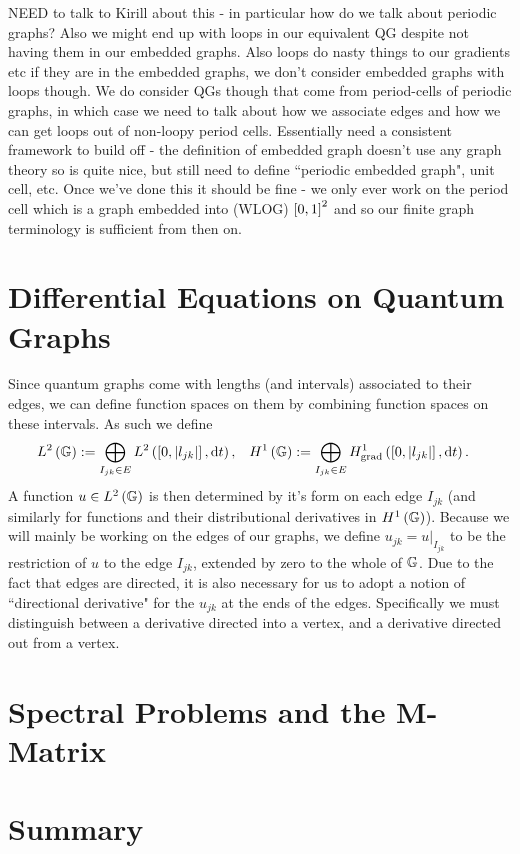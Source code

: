 NEED to talk to Kirill about this - in particular how do we talk about periodic graphs? Also we might end up with loops in our equivalent QG despite not having them in our embedded graphs.
Also loops do nasty things to our gradients etc if they are in the embedded graphs, we don't consider embedded graphs with loops though.
We do consider QGs though that come from period-cells of periodic graphs, in which case we need to talk about how we associate edges and how we can get loops out of non-loopy period cells.
Essentially need a consistent framework to build off - the definition of embedded graph doesn't use any graph theory so is quite nice, but still need to define ``periodic embedded graph", unit cell, etc.
Once we've done this it should be fine - we only ever work on the period cell which is a graph embedded into (WLOG) $\left[ 0,1 \right]^2$ and so our finite graph terminology is sufficient from then on.

\section{Differential Equations on Quantum Graphs}
Since quantum graphs come with lengths (and intervals) associated to their edges, we can define function spaces on them by combining function spaces on these intervals.
As such we define
\begin{align*}
	L^2\left( \mathbb{G} \right) := \bigoplus_{I_{jk}\in E} L^{2}\left( \left[ 0,\left\lvert l_{jk} \right\rvert \right],\mathrm{d}t \right),
	&\quad H^1\left( \mathbb{G} \right) := \bigoplus_{I_{jk}\in E} H^1_\mathrm{grad}\left( \left[ 0,\left\lvert l_{jk} \right\rvert \right], \mathrm{d}t \right).
\end{align*}
A function $u\in L^2\left( \mathbb{G} \right)$ is then determined by it's form on each edge $I_{jk}$ (and similarly for functions and their distributional derivatives in $H^1\left( \mathbb{G} \right)$).
Because we will mainly be working on the edges of our graphs, we define $u_{jk} = u\vert_{I_{jk}}$ to be the restriction of $u$ to the edge $I_{jk}$, extended by zero to the whole of $\mathbb{G}$.
Due to the fact that edges are directed, it is also necessary for us to adopt a notion of ``directional derivative" for the $u_{jk}$ at the ends of the edges.
Specifically we must distinguish between a derivative directed into a vertex, and a derivative directed out from a vertex.

\section{Spectral Problems and the M-Matrix}

\section{Summary}